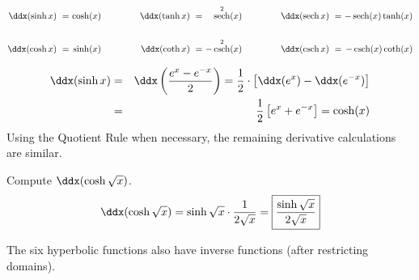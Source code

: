 \documentclass{book}
\DeclareMathOperator{\sech}{sech}
\DeclareMathOperator{\csch}{csch}
\begin{document}
\begin{Prop} 
\[\begin{alignedat}{100}
\ddx(\sinh x)\ &=\ & \cosh(x)\ &\qquad\qquad& \ddx(\tanh x)\ &=\ & \sech^2(x) \ &\qquad\qquad& \ddx(\sech x)\ &=\ & -\sech(x)\tanh(x)\\\\
\ddx(\cosh x)\ &=\ & \sinh(x)\ &\qquad\qquad& \ddx(\coth x)\ &=\ & -\csch^2(x)\ &\qquad\qquad& \ddx(\csch x)\ &=\ & -\csch(x)\coth(x)
\end{alignedat}\]
\end{Prop}
\begin{pf}\mbox{}\vspace{-30pt}

\begin{eqnarray*}
\ddx(\sinh x) &=& \ddx\left(\dfrac{e^x-e^{-x}}{2}\right) = \dfrac{1}{2}\cdot\left[\ddx(e^x) - \ddx(e^{-x})\right]\\
&=& \dfrac{1}{2}\left[e^x + e^{-x}\right] = \cosh(x)
\end{eqnarray*}
Using the Quotient Rule when necessary, the remaining derivative calculations are similar.
\end{pf}\vs

\begin{Exam} Compute $\ddx(\cosh \sqrt{x})$.\\
\[\ddx(\cosh\sqrt{x}) = \sinh\sqrt{x} \cdot \dfrac{1}{2\sqrt{x}} = \fbox{$\dfrac{\sinh \sqrt{x}}{2\sqrt{x}}$}\]
\end{Exam}\vs

The six hyperbolic functions also have inverse functions (after restricting domains).
\end{document}
